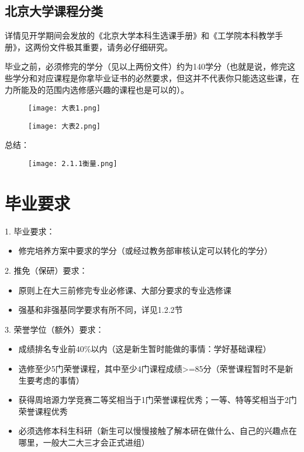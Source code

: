 \documentclass[11pt,oneside]{book}
\begin{document}
\subsection{北京大学课程分类}
详情见开学期间会发放的《北京大学本科生选课手册》和《工学院本科教学手册》，这两份文件极其重要，请务必仔细研究。

毕业之前，必须修完的学分（见以上两份文件）约为140学分（也就是说，修完这些学分和对应课程是你拿毕业证书的必然要求，但这并不代表你只能选这些课，在力所能及的范围内选修感兴趣的课程也是可以的）。

\begin{figure}[htbp]
    \centering
    \texttt{[image: 大表1.png]}
\end{figure}

\begin{figure}[htbp]
    \centering
    \texttt{[image: 大表2.png]}
\end{figure}



总结：
\begin{figure}[htbp]
    \centering
    \texttt{[image: 2.1.1衡量.png]}
\end{figure}

\section{毕业要求}
1. 毕业要求：

\begin{itemize}
    \item 修完培养方案中要求的学分（或经过教务部审核认定可以转化的学分）
\end{itemize}

2. 推免（保研）要求：

\begin{itemize}
    \item 原则上在大三前修完专业必修课、大部分要求的专业选修课
    \item 强基和非强基同学要求有所不同，详见1.2.2节
\end{itemize}

3. 荣誉学位（额外）要求：

\begin{itemize}
    \item 成绩排名专业前40\%以内（这是新生暂时能做的事情：学好基础课程）
    \item 选修至少5门荣誉课程，其中至少4门课程成绩>=85分（荣誉课程暂时不是新生要考虑的事情）
    \item 获得周培源力学竞赛二等奖相当于1门荣誉课程优秀；一等、特等奖相当于2门荣誉课程优秀
    \item 必须选修本科生科研（新生可以慢慢接触了解本研在做什么、自己的兴趣点在哪里，一般大二大三才会正式进组）
\end{itemize}
\end{document}
